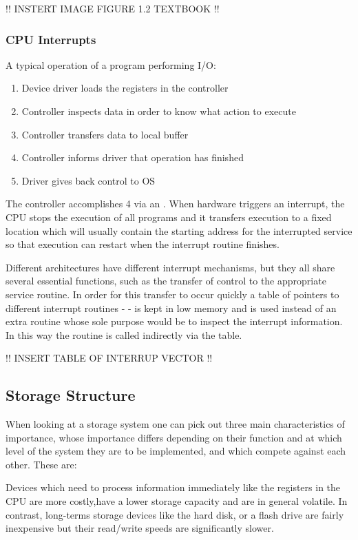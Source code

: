 	!! INSTERT IMAGE FIGURE 1.2 TEXTBOOK !!


	\subsubsection{CPU Interrupts}

		\par{A typical operation of a program performing I/O:}

			\begin{enumerate}
				\item Device driver loads the registers in the controller
				\item Controller inspects data in order to know what action to execute
				\item Controller transfers data to local buffer
				\item Controller informs driver that operation has finished
				\item Driver gives back control to OS
			\end{enumerate}

		\par{The controller accomplishes 4 via an . When hardware triggers an interrupt, the CPU stops the execution of all programs and it transfers execution to a fixed location which will usually contain the starting address for the interrupted service so that execution can restart when the interrupt routine finishes.}
		\par{Different architectures have different interrupt mechanisms, but they all share several essential functions, such as the transfer of control to the appropriate service routine. In order for this transfer to occur quickly a table of pointers to different interrupt routines -  - is kept in low memory and is used instead of an extra routine whose sole purpose would be to inspect the interrupt information. In this way the routine is called indirectly via the table.}

		!! INSERT TABLE OF INTERRUP VECTOR !!


	\subsection{Storage Structure}

	\par{When looking at a storage system one can pick out three main characteristics of importance, whose importance differs depending on their function and at which level of the system they are to be implemented, and which compete against each other. These are: }
	\par{Devices which need to process information immediately like the registers in the CPU are more costly,have a lower storage capacity and are in general volatile. In contrast, long-terms storage devices like the hard disk, or a flash drive are fairly inexpensive but their read/write speeds are significantly slower.}

